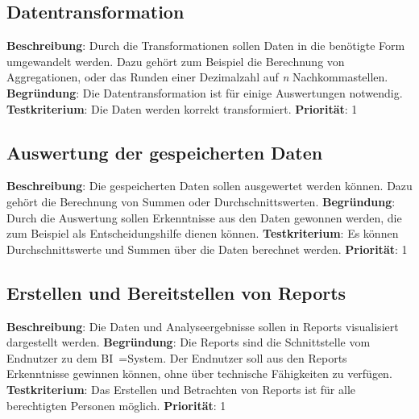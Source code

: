 \subsection{Datentransformation} \label{sec:anforderungsspezifikation:datentransformation}
\textbf{Beschreibung}: Durch die Transformationen sollen Daten in die benötigte Form umgewandelt werden. Dazu gehört zum Beispiel die Berechnung von Aggregationen, oder das Runden einer Dezimalzahl auf \textit{n} Nachkommastellen.
\newline \textbf{Begründung}: Die Datentransformation ist für einige Auswertungen notwendig.
\newline \textbf{Testkriterium}: Die Daten werden korrekt transformiert.
\newline \textbf{Priorität}: 1

\subsection{Auswertung der gespeicherten Daten} \label{sec:anforderungsspezifikation:datenAuswertung}
\textbf{Beschreibung}: Die gespeicherten Daten sollen ausgewertet werden können. Dazu gehört die Berechnung von Summen oder Durchschnittswerten.
\newline \textbf{Begründung}: Durch die Auswertung sollen Erkenntnisse aus den Daten gewonnen werden, die zum Beispiel als Entscheidungshilfe dienen können.
\newline \textbf{Testkriterium}: Es können Durchschnittswerte und Summen über die Daten berechnet werden.
\newline \textbf{Priorität}: 1

\subsection{Erstellen und Bereitstellen von Reports} \label{sec:anforderungsspezifikation:reports}
\textbf{Beschreibung}: Die Daten und Analyseergebnisse sollen in Reports visualisiert dargestellt werden.
\newline \textbf{Begründung}: Die Reports sind die Schnittstelle vom Endnutzer zu dem BI~=System. Der Endnutzer soll aus den Reports Erkenntnisse gewinnen können, ohne über technische Fähigkeiten zu verfügen.
\newline \textbf{Testkriterium}: Das Erstellen und Betrachten von Reports ist für alle berechtigten Personen möglich.
\newline \textbf{Priorität}: 1

